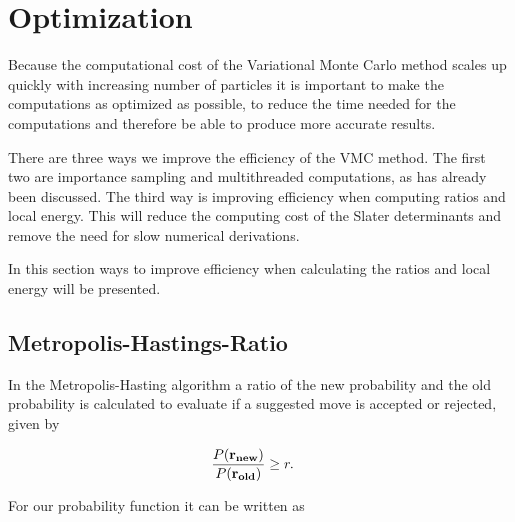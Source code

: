 \section{Optimization}
	Because the computational cost of the Variational Monte Carlo method scales up quickly with increasing number of particles it is important to make the computations as optimized as possible, to reduce the time needed for the computations and therefore be able to produce more accurate results. 

	There are three ways we improve the efficiency of the VMC method. The first two are  importance sampling and multithreaded computations, as has already been discussed. The third way is improving efficiency when computing ratios and local energy. This will reduce the computing cost of the Slater determinants and remove the need for slow numerical derivations.

	In this section ways to improve efficiency when calculating the ratios and local energy will be presented.



	
	\subsection{Metropolis-Hastings-Ratio}
		In the Metropolis-Hasting algorithm a ratio of the new probability and the old probability is calculated to evaluate if a suggested move is accepted or rejected, given by

		\begin{align}
			\frac{P(\vb{r_{new}})}{P(\vb{r_{old})}} &\ge r .
		\end{align} 

		For our probability function it can be written as

